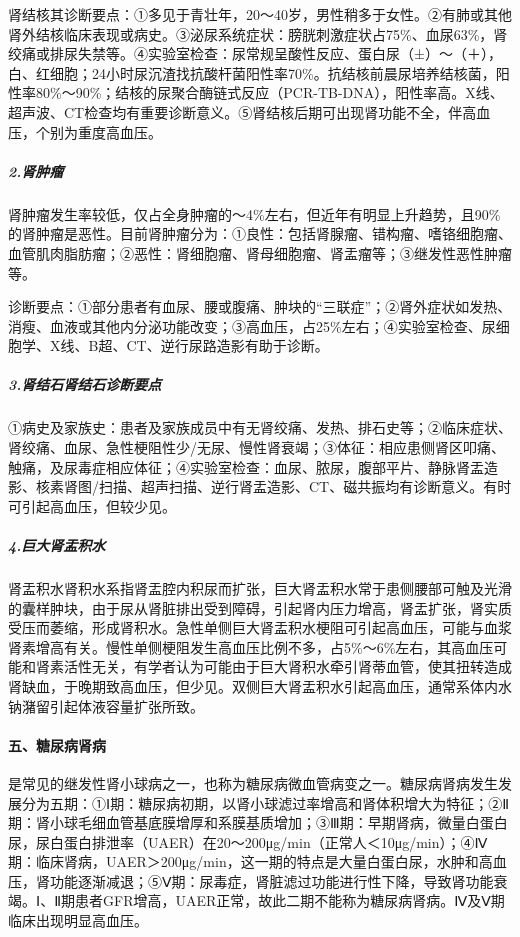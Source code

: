肾结核其诊断要点：①多见于青壮年，20～40岁，男性稍多于女性。②有肺或其他肾外结核临床表现或病史。③泌尿系统症状：膀胱刺激症状占75\%、血尿63\%，肾绞痛或排尿失禁等。④实验室检查：尿常规呈酸性反应、蛋白尿（±）～（＋），白、红细胞；24小时尿沉渣找抗酸杆菌阳性率70\%。抗结核前晨尿培养结核菌，阳性率80\%～90\%；结核的尿聚合酶链式反应（PCR-TB-DNA），阳性率高。X线、超声波、CT检查均有重要诊断意义。⑤肾结核后期可出现肾功能不全，伴高血压，个别为重度高血压。

\subparagraph{2.肾肿瘤}

肾肿瘤发生率较低，仅占全身肿瘤的～4\%左右，但近年有明显上升趋势，且90\%的肾肿瘤是恶性。目前肾肿瘤分为：①良性：包括肾腺瘤、错构瘤、嗜铬细胞瘤、血管肌肉脂肪瘤；②恶性：肾细胞瘤、肾母细胞瘤、肾盂瘤等；③继发性恶性肿瘤等。

诊断要点：①部分患者有血尿、腰或腹痛、肿块的“三联症”；②肾外症状如发热、消瘦、血液或其他内分泌功能改变；③高血压，占25\%左右；④实验室检查、尿细胞学、X线、B超、CT、逆行尿路造影有助于诊断。

\subparagraph{3.肾结石肾结石诊断要点}

①病史及家族史：患者及家族成员中有无肾绞痛、发热、排石史等；②临床症状、肾绞痛、血尿、急性梗阻性少/无尿、慢性肾衰竭；③体征：相应患侧肾区叩痛、触痛，及尿毒症相应体征；④实验室检查：血尿、脓尿，腹部平片、静脉肾盂造影、核素肾图/扫描、超声扫描、逆行肾盂造影、CT、磁共振均有诊断意义。有时可引起高血压，但较少见。

\subparagraph{4.巨大肾盂积水}

肾盂积水肾积水系指肾盂腔内积尿而扩张，巨大肾盂积水常于患侧腰部可触及光滑的囊样肿块，由于尿从肾脏排出受到障碍，引起肾内压力增高，肾盂扩张，肾实质受压而萎缩，形成肾积水。急性单侧巨大肾盂积水梗阻可引起高血压，可能与血浆肾素增高有关。慢性单侧梗阻发生高血压比例不多，占5\%～6\%左右，其高血压可能和肾素活性无关，有学者认为可能由于巨大肾积水牵引肾蒂血管，使其扭转造成肾缺血，于晚期致高血压，但少见。双侧巨大肾盂积水引起高血压，通常系体内水钠潴留引起体液容量扩张所致。

\paragraph{五、糖尿病肾病}

是常见的继发性肾小球病之一，也称为糖尿病微血管病变之一。糖尿病肾病发生发展分为五期：①Ⅰ期：糖尿病初期，以肾小球滤过率增高和肾体积增大为特征；②Ⅱ期：肾小球毛细血管基底膜增厚和系膜基质增加；③Ⅲ期：早期肾病，微量白蛋白尿，尿白蛋白排泄率（UAER）在20～200μg/min（正常人＜10μg/min）；④Ⅳ期：临床肾病，UAER＞200μg/min，这一期的特点是大量白蛋白尿，水肿和高血压，肾功能逐渐减退；⑤Ⅴ期：尿毒症，肾脏滤过功能进行性下降，导致肾功能衰竭。Ⅰ、Ⅱ期患者GFR增高，UAER正常，故此二期不能称为糖尿病肾病。Ⅳ及Ⅴ期临床出现明显高血压。

